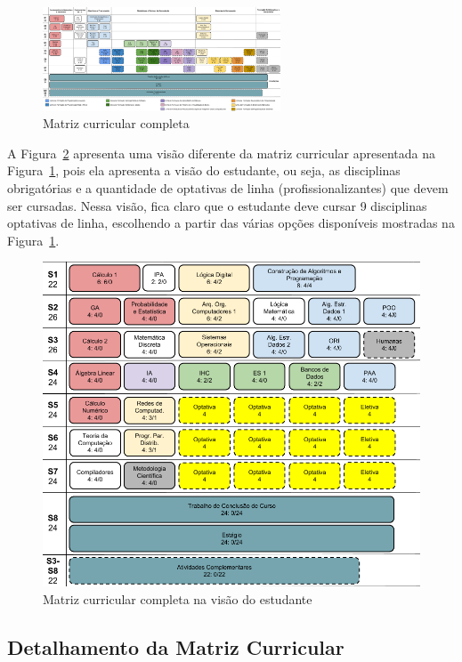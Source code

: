 \newpage
\begin{figure}[H]
\centering
\includegraphics[angle=90,width=0.63\textwidth]{imagens/Grade.png}
\caption{Matriz curricular completa}
\label{fig:matriz}
\end{figure}

A Figura~\ref{fig:matriz_visao_aluno} apresenta uma visão diferente da matriz curricular apresentada na Figura~\ref{fig:matriz}, pois ela apresenta a visão do estudante, ou seja, as disciplinas obrigatórias e a quantidade de optativas de linha (profissionalizantes) que devem ser cursadas. Nessa visão, fica claro que o estudante deve cursar 9 disciplinas optativas de linha, escolhendo a partir das várias opções disponíveis mostradas na Figura~\ref{fig:matriz}.


\begin{figure}[H]
\centering
\includegraphics[width=1\textwidth]{imagens/Grade_visao_aluno.png}
\caption{Matriz curricular completa na visão do estudante}
\label{fig:matriz_visao_aluno}
\end{figure}


\subsection{Detalhamento da Matriz Curricular}

